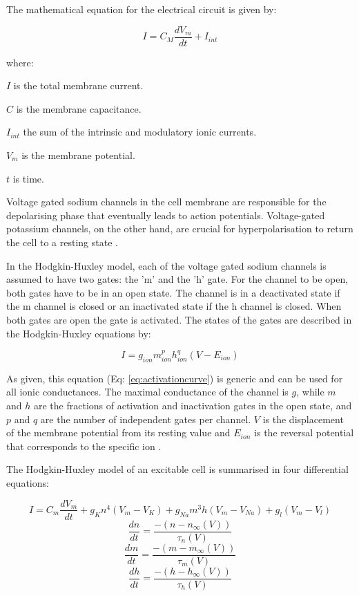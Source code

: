 The mathematical equation for the electrical circuit is given by:

\begin{equation}
\label{eq:membrane_current}
I=C_{M}\frac{dV_{m}}{dt} + I_{int}
\end{equation}

where: 

$I$ is the total membrane current.

$C$ is the membrane capacitance.

$I_{int}$ the sum of the intrinsic and modulatory ionic currents.

$V_{m}$ is the membrane potential.

$t$ is time.



Voltage gated sodium channels in the cell membrane are responsible for the depolarising phase that eventually leads to action potentials. Voltage-gated potassium channels, on the other hand, are crucial for hyperpolarisation to return the cell to a resting state \cite{Lodish2000}.


In the Hodgkin-Huxley model, each of the voltage gated sodium channels is assumed to have two gates: the 'm' and the 'h' gate. For the channel to be open, both gates have to be in an open state. The channel is in a deactivated state if the m channel is closed or an inactivated state if the h channel is closed. When both gates are open the gate is activated. The states of the gates are described in the Hodgkin-Huxley equations by:

\begin{equation}
\label{eq:activationcurve}
I = g_{ion}m^{p}_{ion}h^{q}_{ion}(V - E_{ion})
\end{equation}

As given, this equation (Eq: \ref{eq:activationcurve}) is generic and can be used for all ionic conductances. The maximal conductance of the channel is $g$, while $m$ and $h$ are the fractions of activation and inactivation gates in the open state, and $p$ and $q$ are the number of independent gates per channel. $V$ is the displacement of the membrane potential from its resting value and $E_{ion}$ is the reversal potential that corresponds to the specific ion \cite{Buchholtz1992, Hodgkin1952a, Willms1999, Soto-Trevino2005}.

The Hodgkin-Huxley model of an excitable cell is summarised in four differential equations:

\begin{equation}
\label{eq:HH}
I = C_{m}\frac{d V_{m}}{dt}  + {g}_{K}n^{4}(V_{m} - V_{K}) + {g}_{Na}m^{3}h(V_m - V_{Na}) + g_{l}(V_{m} - V_{l})
\end{equation}
\begin{equation}
\frac{dn}{dt} = \frac{-(n-n_{\infty}(V)) }{ \tau_{n}(V)}
\end{equation}
\begin{equation}
\frac{dm}{dt} = \frac{-(m-m_{\infty}(V)) }{ \tau_{m}(V)}
\end{equation}
\begin{equation}
\frac{dh}{dt} = \frac{-(h-h_{\infty}(V)) }{ \tau_{h}(V)}
\end{equation}

